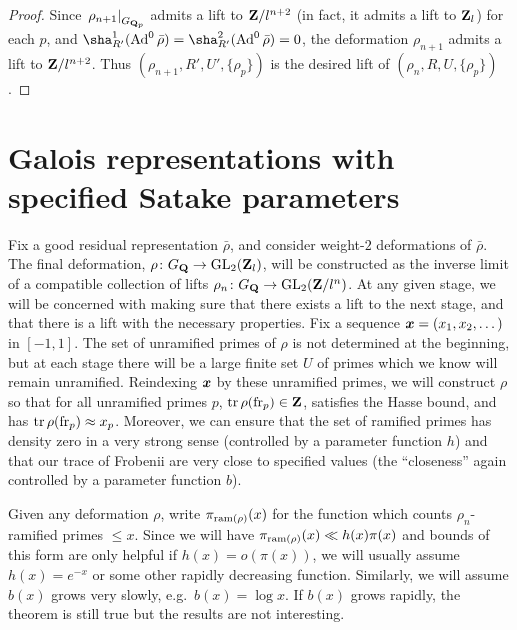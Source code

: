 \begin{proof}
Since $\left.\rho_{n+1}\right|_{G_{\mathbf{Q}_p}}$ admits a lift to $\mathbf{Z}/l^{n+2}$ (in 
fact, it admits a lift to $\mathbf{Z}_l$) for each $p$, and 
$\sha_{R'}^1(\Ad^0\bar\rho) = \sha_{R'}^2(\Ad^0\bar\rho) = 0$, the deformation 
$\rho_{n+1}$ admits a lift to $\mathbf{Z}/l^{n+2}$. Thus 
$(\rho_{n+1},R',U',\{\rho_p\})$ is the desired lift of 
$(\rho_n,R,U,\{\rho_p\})$. 
\end{proof}





\section{Galois representations with specified Satake parameters}

Fix a good residual representation $\bar\rho$, and consider weight-$2$ 
deformations of $\bar\rho$. The final deformation, 
$\rho\colon G_{\mathbf{Q}} \to \operatorname{GL}_2(\mathbf{Z}_l)$, will be constructed as the inverse limit 
of a compatible collection of lifts $\rho_n\colon G_{\mathbf{Q}} \to \operatorname{GL}_2(\mathbf{Z}/l^n)$. At 
any given stage, we will be concerned with making sure that there exists a 
lift to the next stage, and that there is a lift with the necessary properties. 
Fix a sequence ${\boldsymbol x}=(x_1,x_2,\dots)$ in $[-1,1]$. The set of unramified primes 
of $\rho$ is not determined at the beginning, but at each stage there will be 
a large finite set $U$ of primes which we know will remain unramified. 
Reindexing ${\boldsymbol x}$ by these unramified primes, we will construct $\rho$ so that 
for all unramified primes $p$, $\operatorname{tr}\rho(\mathrm{fr}_p)\in \mathbf{Z}$, satisfies the Hasse 
bound, and has $\operatorname{tr}\rho(\mathrm{fr}_p) \approx x_p$. Moreover, we can ensure that the 
set of ramified primes has density zero in a very strong sense (controlled by a 
parameter function $h$) and that our trace of Frobenii are very close to 
specified values (the ``closeness'' again controlled by a parameter function 
$b$). 

Given any deformation $\rho$, write $\pi_{\mathrm{ram}(\rho)}(x)$ for the function 
which counts $\rho_n$-ramified primes $\leqslant x$. Since we will have 
$\pi_{\mathrm{ram}(\rho)}(x)\ll h(x) \pi(x)$ and bounds of this form are only helpful 
if $h(x) = o(\pi(x))$, we will usually assume $h(x) = e^{-x}$ or some other 
rapidly decreasing function. Similarly, we will assume $b(x)$ grows very 
slowly, e.g.~$b(x) = \log x$. If $b(x)$ grows rapidly, the theorem is still 
true but the results are not interesting. 

